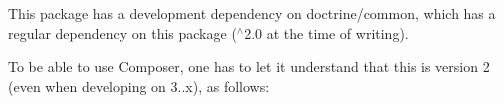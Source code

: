 This package has a development dependency on {\ttfamily doctrine/common}, which has a regular dependency on this package ({\ttfamily $^\wedge$2.0} at the time of writing).

To be able to use Composer, one has to let it understand that this is version 2 (even when developing on 3..\+x), as follows\+:


\begin{DoxyCode}{0}

\end{DoxyCode}
 